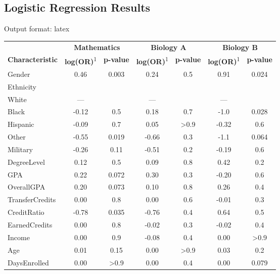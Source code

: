 \clearpage
\makeatletter
\efloat@restorefloats
\makeatother


\begin{appendix}
\hypertarget{logistic-regression-results}{%
\section{Logistic Regression
Results}\label{logistic-regression-results}}

Output format: latex

\captionsetup[table]{labelformat=empty,skip=1pt}
\setlength{\LTpost}{0mm}
\begin{longtable}{lcccccc}
\toprule
 & \multicolumn{2}{c}{\textbf{Mathematics}} & \multicolumn{2}{c}{\textbf{Biology A}} & \multicolumn{2}{c}{\textbf{Biology B}} \\ 
\cmidrule(lr){2-3} \cmidrule(lr){4-5} \cmidrule(lr){6-7}
\textbf{Characteristic} & \textbf{log(OR)}\textsuperscript{1} & \textbf{p-value} & \textbf{log(OR)}\textsuperscript{1} & \textbf{p-value} & \textbf{log(OR)}\textsuperscript{1} & \textbf{p-value} \\ 
\midrule
Gender & 0.46 & 0.003 & 0.24 & 0.5 & 0.91 & 0.024 \\ 
Ethnicity &  &  &  &  &  &  \\ 
White & — &  & — &  & — &  \\ 
Black & -0.12 & 0.5 & 0.18 & 0.7 & -1.0 & 0.028 \\ 
Hispanic & -0.09 & 0.7 & 0.05 & >0.9 & -0.32 & 0.6 \\ 
Other & -0.55 & 0.019 & -0.66 & 0.3 & -1.1 & 0.064 \\ 
Military & -0.26 & 0.11 & -0.51 & 0.2 & -0.19 & 0.6 \\ 
DegreeLevel & 0.12 & 0.5 & 0.09 & 0.8 & 0.42 & 0.2 \\ 
GPA & 0.22 & 0.072 & 0.30 & 0.3 & -0.20 & 0.6 \\ 
OverallGPA & 0.20 & 0.073 & 0.10 & 0.8 & 0.26 & 0.4 \\ 
TransferCredits & 0.00 & 0.8 & 0.00 & 0.6 & -0.01 & 0.3 \\ 
CreditRatio & -0.78 & 0.035 & -0.76 & 0.4 & 0.64 & 0.5 \\ 
EarnedCredits & 0.00 & 0.8 & -0.02 & 0.3 & -0.02 & 0.4 \\ 
Income & 0.00 & 0.9 & -0.08 & 0.4 & 0.00 & >0.9 \\ 
Age & 0.01 & 0.15 & 0.00 & >0.9 & 0.03 & 0.2 \\ 
DaysEnrolled & 0.00 & >0.9 & 0.00 & 0.4 & 0.00 & 0.079 \\ 

\end{longtable}
\end{appendix}
